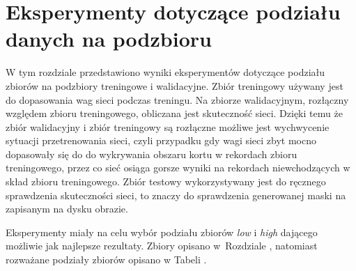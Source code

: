 \section{Eksperymenty dotyczące podziału danych na podzbioru}
\label{sec:podzial_eksperyment}

W tym rozdziale przedstawiono wyniki eksperymentów dotyczące podziału zbiorów na podzbiory treningowe i walidacyjne.
Zbiór treningowy używany jest do dopasowania wag sieci podczas treningu.
Na zbiorze walidacyjnym, rozłączny względem zbioru treningowego, obliczana jest skuteczność sieci.
Dzięki temu że zbiór walidacyjny i zbiór treningowy są rozłączne możliwe jest wychwycenie sytuacji przetrenowania sieci, czyli przypadku gdy wagi sieci zbyt mocno dopasowały się do do wykrywania obszaru kortu w rekordach zbioru treningowego, przez co sieć osiąga gorsze wyniki na rekordach niewchodzących w skład zbioru treningowego.
Zbiór testowy wykorzystywany jest do ręcznego sprawdzenia skuteczności sieci, to znaczy do sprawdzenia generowanej maski na zapisanym na dysku obrazie.

Eksperymenty miały na celu wybór podziału zbiorów \textit{low} i \textit{high} dającego możliwie jak najlepsze rezultaty. Zbiory opisano w~Rozdziale , natomiast rozważane podziały zbiorów opisano w Tabeli .
